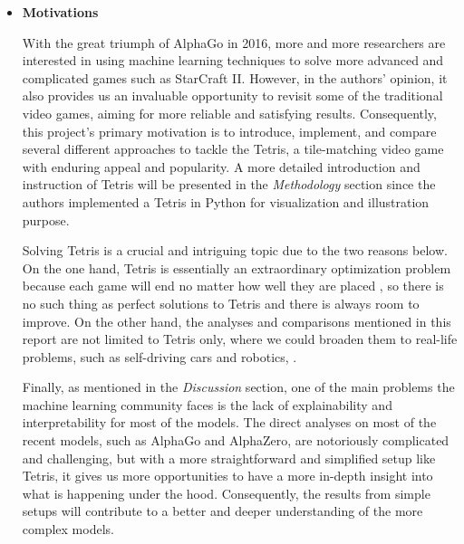 \documentclass[letterpaper]{article} %
\begin{document}
%
\begin{itemize} 

\item 
{\bf Motivations}


With the great triumph of AlphaGo in 2016, more and more researchers are interested in using machine learning techniques to solve more advanced and complicated games such as StarCraft II. However, in the authors' opinion, it also provides us an invaluable opportunity to revisit some of the traditional video games, aiming for more reliable and satisfying results. Consequently, this project's primary motivation is to introduce, implement, and compare several different approaches to tackle the Tetris, a tile-matching video game with enduring appeal and popularity. A more detailed introduction and instruction of Tetris will be presented in the {\it Methodology} section since the authors implemented a Tetris in Python for visualization and illustration purpose.

Solving Tetris is a crucial and intriguing topic due to the two reasons below. On the one hand, Tetris is essentially an extraordinary optimization problem because each game will end no matter how well they are placed \cite{burgiel_1997}, so there is no such thing as perfect solutions to Tetris and there is always room to improve. On the other hand, the analyses and comparisons mentioned in this report are not limited to Tetris only, where we could broaden them to real-life problems, such as self-driving cars and robotics, .

Finally, as mentioned in the {\it Discussion} section, one of the main problems the machine learning community faces is the lack of explainability and interpretability for most of the models. The direct analyses on most of the recent models, such as AlphaGo and AlphaZero, are notoriously complicated and challenging, but with a more straightforward and simplified setup like Tetris, it gives us more opportunities to have a more in-depth insight into what is happening under the hood. Consequently, the results from simple setups will contribute to a better and deeper understanding of the more complex models.


\end{itemize}
\end{document}
